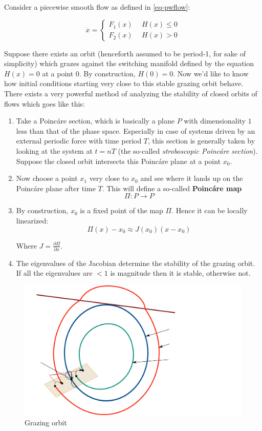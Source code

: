 \documentclass{book}
\renewcommand{\(}{\begin{columns}}
\renewcommand{\)}{\end{columns}}
\newcommand{\<}[1]{\begin{column}{#1}}
\renewcommand{\>}{\end{column}}
\newcommand{\bb}[1]{\textbf{#1}}
\begin{document}
Consider a piecewise smooth flow as defined in \eqref{eq-pwflow}:

\begin{equation}
\label{ex-pwflow}
\dot{x}=
\begin{cases}
F_1(x)&~~H(x)\le 0\\
F_2(x)&~~H(x)> 0
\end{cases}
\end{equation}

Suppose there exists an orbit (henceforth assumed to be period-1, for sake of 
simplicity)  which grazes against the switching manifold defined by the 
equation $H(x)=0$ at a point $0$.  By construction, $H(0)=0$.  Now we'd like 
to know how initial conditions starting very close to this stable grazing 
orbit behave.  There exists a very powerful method of analyzing the stability 
of closed orbits of flows which goes like this:

\begin{enumerate}
\item Take a Poincáre section, which is basically a plane $P$ with dimensionality $1$ 
less than that of the phase space. Especially in case of systems driven by an 
external periodic force with time period $T$, this section is generally taken 
by looking at the system at $t=nT$ (the so-called \emph{stroboscopic Poincáre section}).
Suppose the closed orbit intersects this Poincáre plane at a point $x_0$. 

\item Now choose a point $x_1$ very close to $x_0$ and see where it lands  up 
on the Poincáre plane after time $T$. This will define a so-called 
\bb{Poincáre map}
\[
\Pi:P\to P
\]
\item By construction, $x_0$ is a fixed point of the map $\Pi$.  Hence it can 
be locally linearized:
\[
\Pi(x)-x_0\approx J(x_0)(x-x_0)
\]

Where $J=\frac{\partial \Pi}{\partial x}$.  
\item The eigenvalues of the Jacobian determine the stability of the grazing 
orbit.  If all the eigenvalues are $<1$ is magnitude then it is stable, 
otherwise not.  

\end{enumerate}
\begin{figure}
\label{fig-grazing-orbit}
\caption{Grazing orbit}
\begin{center}
\includegraphics[width=0.6\columnwidth]{graz}
\end{center}
\end{figure}
\end{document}

